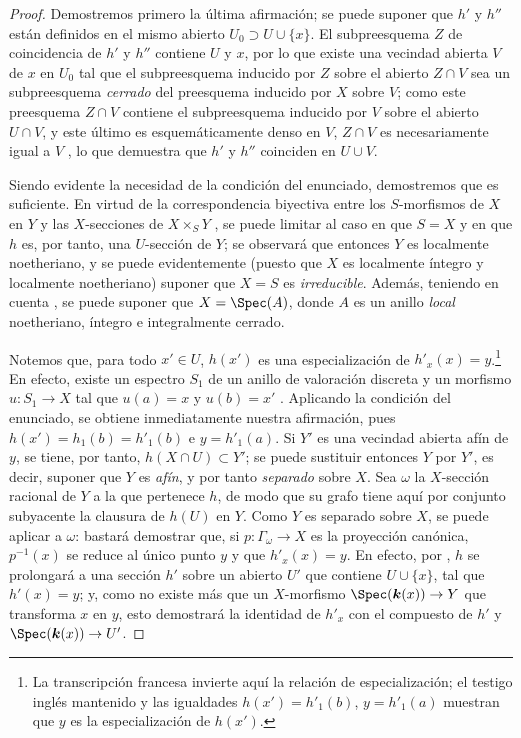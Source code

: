 \begin{proof}
Demostremos primero la última afirmación; se puede suponer que $h'$ y $h''$ están definidos en el mismo abierto $U_0\supset U\cup\{x\}$.
El subpreesquema $Z$ de coincidencia de $h'$ y $h''$  contiene $U$ y $x$, por lo que existe una vecindad abierta $V$ de $x$ en $U_0$ tal que el subpreesquema inducido por $Z$ sobre el abierto $Z\cap V$ sea un subpreesquema \emph{cerrado} del preesquema inducido por $X$ sobre $V$; como este preesquema $Z\cap V$ contiene el subpreesquema inducido por $V$ sobre el abierto $U\cap V$, y este último es esquemáticamente denso en $V$, $Z\cap V$ es necesariamente igual a $V$ , lo que demuestra que $h'$ y $h''$ coinciden en $U\cup V$.

Siendo evidente la necesidad de la condición del enunciado, demostremos que es suficiente.
En virtud de la correspondencia biyectiva entre los $S$-morfismos de $X$ en $Y$ y las $X$-secciones de $X\times_S Y$ , se puede limitar al caso en que $S=X$ y en que $h$ es, por tanto, una $U$-sección de $Y$; se observará que entonces $Y$ es localmente noetheriano, y se puede evidentemente (puesto que $X$ es localmente íntegro y localmente noetheriano) suponer que $X=S$ es \emph{irreducible}.
Además, teniendo en cuenta , se puede suponer que $X=\Spec(A)$, donde $A$ es un anillo \emph{local} noetheriano, íntegro e integralmente cerrado.

Notemos que, para todo $x'\in U$, $h(x')$ es una especialización de $h'_x(x)=y$.\footnote{La transcripción francesa invierte aquí la relación de especialización; el testigo inglés mantenido y las igualdades $h(x')=h'_1(b)$, $y=h'_1(a)$ muestran que $y$ es la especialización de $h(x')$.}
En efecto, existe un espectro $S_1$ de un anillo de valoración discreta y un morfismo $u:S_1\to X$ tal que $u(a)=x$ y $u(b)=x'$ .
Aplicando la condición del enunciado, se obtiene inmediatamente nuestra afirmación, pues $h(x')=h_1(b)=h'_1(b)$ e $y=h'_1(a)$.
Si $Y'$ es una vecindad abierta afín de $y$, se tiene, por tanto, $h(X\cap U)\subset Y'$; se puede sustituir entonces $Y$ por $Y'$, es decir, suponer que $Y$ es \emph{afín}, y por tanto \emph{separado} sobre $X$.
Sea $\omega$ la $X$-sección racional de $Y$ a la que pertenece $h$, de modo que su grafo tiene aquí por conjunto subyacente la clausura de $h(U)$ en $Y$.
Como $Y$ es separado sobre $X$, se puede aplicar  a $\omega$: bastará demostrar que, si $p:\Gamma_\omega\to X$ es la proyección canónica, $p^{-1}(x)$ se reduce al único punto $y$ y que $h'_x(x)=y$.
En efecto, por , $h$ se prolongará a una sección $h'$ sobre un abierto $U'$ que contiene $U\cup\{x\}$, tal que $h'(x)=y$; y, como no existe más que un $X$-morfismo $\Spec(\boldsymbol{k}(x))\to Y$ que transforma $x$ en $y$, esto demostrará la identidad de $h'_x$ con el compuesto de $h'$ y $\Spec(\boldsymbol{k}(x))\to U'$.


\end{proof}
